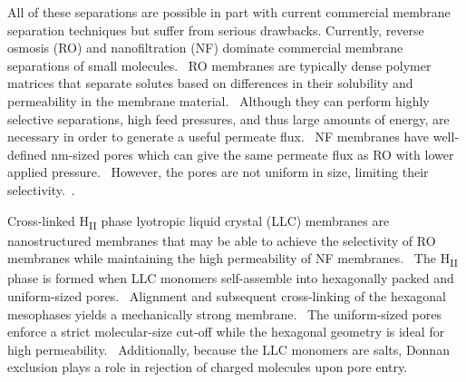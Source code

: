 \documentclass[journal=jpcbfk,manuscript=article]{achemso}
\begin{document}
  All of these separations are possible in part with current commercial
  membrane separation techniques but suffer from serious drawbacks. Currently,
  reverse osmosis (RO) and nanofiltration (NF) dominate commercial membrane
  separations of small molecules.~\cite{warsinger_review_2018} RO membranes are
  typically dense polymer matrices that separate solutes based on differences in
  their solubility and permeability in the membrane
  material.~\cite{fritzmann_state---art_2007} Although they can perform highly
  selective separations, high feed pressures, and thus large amounts of energy,
  are necessary in order to generate a useful permeate
  flux.~\cite{van_der_bruggen_review_2003} NF membranes have well-defined
  nm-sized pores which can give the same permeate flux as RO with lower applied
  pressure.~\cite{hilal_comprehensive_2004} However, the pores are not uniform in
  size, limiting their selectivity.~\cite{werber_materials_2016}.
  

  Cross-linked H\textsubscript{II} phase lyotropic liquid crystal (LLC) 
  membranes are nanostructured membranes that may be able to achieve the
  selectivity of RO membranes while maintaining the high permeability
  of NF membranes.~\cite{zhou_supported_2005} The H\textsubscript{II}
  phase is formed when LLC monomers self-assemble into hexagonally packed
  and uniform-sized pores.~\cite{smith_ordered_1997} Alignment and subsequent
  cross-linking of the hexagonal mesophases yields a mechanically strong
  membrane.~\cite{feng_scalable_2014,feng_thin_2016} The uniform-sized pores
  enforce a strict molecular-size cut-off while the hexagonal geometry is 
  ideal for high permeability.~\cite{zhou_supported_2005} Additionally, 
  because the LLC monomers are salts, Donnan exclusion plays a role in 
  rejection of charged molecules upon pore entry.~\cite{donnan_theory_1995}
  
\end{document}
